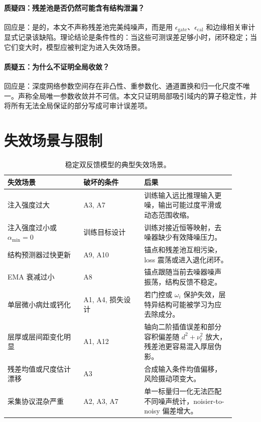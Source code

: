 \documentclass[11pt,a4paper,UTF8,fontset=fandol]{ctexart}
\theoremstyle{definition}
\begin{document}
\paragraph{质疑四：残差池是否仍然可能含有结构泄漏？}
回应是：是的，本文不声称残差池完美纯噪声，而是用 $\epsilon_{\mathrm{gate}}$、$\epsilon_{\mathrm{cal}}$ 和边缘相关审计显式记录该缺陷。理论结论是条件性的：当这些可测误差足够小时，闭环稳定；当它们变大时，模型应被判定为进入失效场景。

\paragraph{质疑五：为什么不证明全局收敛？}
回应是：深度网络参数空间存在非凸性、重参数化、通道置换和归一化尺度不唯一。声称全局唯一参数收敛并不可信。本文只证明局部吸引域内的算子稳定性，并将所有无法全局保证的部分写成可审计误差项。


\section{失效场景与限制}

\begin{table}[htbp]
\centering
\small
\begin{tabular}{p{0.30\linewidth}p{0.24\linewidth}p{0.36\linewidth}}
\toprule
失效场景 & 破坏的条件 & 后果 \\
\midrule
注入强度过大 & A3, A7 & 训练输入远比推理输入更噪，输出可能过度平滑或动态范围收缩。 \\
注入强度过小或 $\alpha_{\min}=0$ & 训练目标设计 & 训练对接近恒等映射，去噪器缺少有效降噪压力。 \\
结构预测器过快更新 & A9, A10 & 锚点和残差池互相污染，loss 震荡或进入退化闭环。 \\
EMA 衰减过小 & A8 & 锚点跟随当前去噪器噪声振荡，结构反馈不稳定。 \\
单层微小病灶或钙化 & A1, A4, 损失设计 & 若门控或 $\omega_i$ 保护失效，层特异结构可能被学习为应去除成分。 \\
层厚或层间距变化明显 & A1, A12 & 轴向二阶插值误差和部分容积偏差随 $d^2+\nu_t^2$ 放大，残差池更容易混入厚层伪影。 \\
残差均值或尺度估计漂移 & A3 & 合成输入条件均值偏移，风险摄动项变大。 \\
采集协议混杂严重 & A2, A3, A7 & 单一标量归一化无法匹配不同噪声统计，noisier-to-noisy 偏差增大。 \\
\bottomrule
\end{tabular}
\caption{稳定双反馈模型的典型失效场景。}
\label{tab:limitations}
\end{table}
\end{document}
